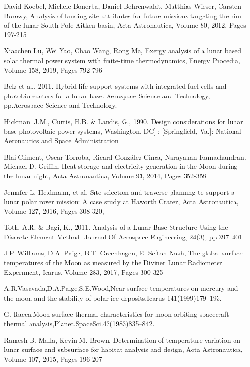\documentclass{beamer}
\begin{document}
\begin{thebibliography}{99}



David Koebel, Michele Bonerba, Daniel Behrenwaldt, Matthias Wieser, Carsten Borowy,
Analysis of landing site attributes for future missions targeting the rim of the lunar South Pole Aitken basin,
Acta Astronautica,
Volume 80,
2012,
Pages 197-215

Xiaochen Lu, Wei Yao, Chao Wang, Rong Ma,
Exergy analysis of a lunar based solar thermal power system with finite-time thermodynamics,
Energy Procedia,
Volume 158,
2019,
Pages 792-796


 Belz et al., 2011. Hybrid life support systems with integrated fuel cells and photobioreactors for a lunar base. Aerospace Science and Technology, pp.Aerospace Science and Technology.

Hickman, J.M., Curtis, H.B. \& Landis, G., 1990. Design considerations for lunar base photovoltaic power systems, Washington, DC] : [Springfield, Va.]: National Aeronautics and Space Administration

Blai Climent, Oscar Torroba, Ricard González-Cinca, Narayanan Ramachandran, Michael D. Griffin,
Heat storage and electricity generation in the Moon during the lunar night,
Acta Astronautica,
Volume 93,
2014,
Pages 352-358

Jennifer L. Heldmann, et al. Site selection and traverse planning to support a lunar polar rover mission: A case study at Haworth Crater,
Acta Astronautica, Volume 127, 2016, Pages 308-320,

Toth, A.R. \& Bagi, K., 2011. Analysis of a Lunar Base Structure Using the Discrete-Element Method. Journal Of Aerospace Engineering, 24(3), pp.397–401.

J.P. Williams, D.A. Paige, B.T. Greenhagen, E. Sefton-Nash,
The global surface temperatures of the Moon as measured by the Diviner Lunar Radiometer Experiment,
Icarus,
Volume 283,
2017,
Pages 300-325


A.R.Vasavada,D.A.Paige,S.E.Wood,Near surface temperatures on
mercury and the moon and the stability of polar ice deposits,Icarus
141(1999)179–193.

G. Racca,Moon surface thermal characteristics for moon orbiting
spacecraft thermal analysis,Planet.SpaceSci.43(1983)835–842.

Ramesh B. Malla, Kevin M. Brown,
Determination of temperature variation on lunar surface and subsurface for habitat analysis and design,
Acta Astronautica,
Volume 107,
2015,
Pages 196-207

\end{thebibliography}
\end{document}
